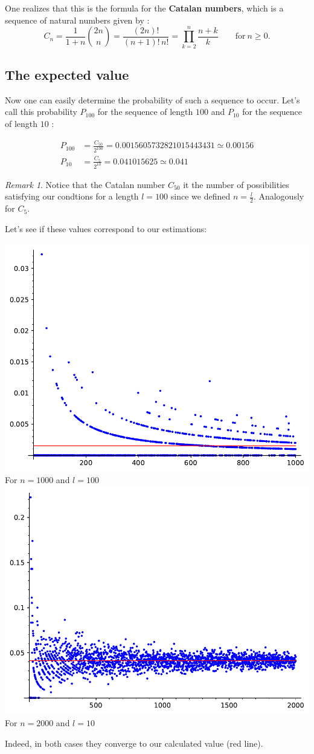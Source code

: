 \documentclass[a4paper,13pt,oneside]{article}
\theoremstyle{remark}
\newtheorem*{remark}{Remark}
\begin{document}
\begin{flushleft}
One realizes that this is the formula for the \textbf{Catalan numbers}, which is a sequence of natural numbers given by :
\[ 
\boxed{C_n = \frac{1}{1+n} \binom{2n}{n}= \frac{(2n)!}{(n+1)! \,n!}=\prod_{k=2}^{n} \frac{n+k}{k} \qquad \text{for} \:n \geq 0.}
\]
\end{flushleft}
\pagebreak
\subsection{The expected value}
Now one can easily determine the probability of such a sequence to occur. Let's call this probability $P_{100}$ for the sequence of length $100$ and $P_{10}$ for the sequence of length $10$ :

\begin{align}
P_{100} &= \frac{C_{50}}{2^{100}} = 0.0015605732821015443431 \simeq 0.00156 \\
P_{10} &= \frac{C_5}{2^{10}} = 0.041015625 \simeq 0.041 
\end{align}

\begin{remark}
Notice that the Catalan number $C_{50}$ it the number of possibilities satisfying our condtions for a length $l = 100$ since we defined $n=\frac{l}{2}$. Analogously for $C_5$.
\end{remark}
\bigskip
Let's see if these values correspond to our estimations:
\begin{center}
		\includegraphics[width=.7\linewidth]{p12.pdf}\\
	For $n=1000$ and $l=100$
		\includegraphics[width=.7\linewidth]{p22.pdf}\\
	For $n=2000$ and $l=10$
	
\end{center}
Indeed, in both cases they converge to our calculated value (red line).
 \pagebreak
\end{document}
